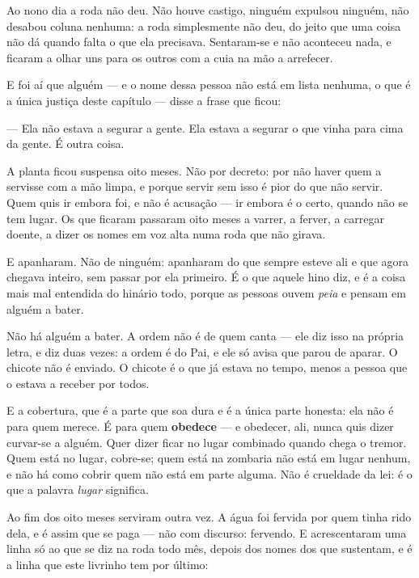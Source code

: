 \documentclass[livro.tex]{subfiles}
\begin{document}
\medskip

Ao nono dia a roda não deu. Não houve castigo, ninguém expulsou ninguém, não desabou coluna
nenhuma: a roda simplesmente não deu, do jeito que uma coisa não dá quando falta o que ela
precisava. Sentaram-se e não aconteceu nada, e ficaram a olhar uns para os outros com a cuia na
mão a arrefecer.

E foi aí que alguém --- e o nome dessa pessoa não está em lista nenhuma, o que é a única
justiça deste capítulo --- disse a frase que ficou:

--- Ela não estava a segurar a gente. Ela estava a segurar o que vinha para cima da gente. É
outra coisa.

\medskip

A planta ficou suspensa oito meses. Não por decreto: por não haver quem a servisse com a mão
limpa, e porque servir sem isso é pior do que não servir. Quem quis ir embora foi, e não é
acusação --- ir embora é o certo, quando não se tem lugar. Os que ficaram passaram oito meses a
varrer, a ferver, a carregar doente, a dizer os nomes em voz alta numa roda que não girava.

E apanharam. Não de ninguém: apanharam do que sempre esteve ali e que agora chegava inteiro,
sem passar por ela primeiro. É o que aquele hino diz, e é a coisa mais mal entendida do hinário
todo, porque as pessoas ouvem \emph{peia} e pensam em alguém a bater.

Não há alguém a bater. A ordem não é de quem canta --- ele diz isso na própria letra, e diz duas
vezes: a ordem é do Pai, e ele só avisa que parou de aparar. O chicote não é enviado. O chicote é
o que já estava no tempo, menos a pessoa que o estava a receber por todos.

\medskip

E a cobertura, que é a parte que soa dura e é a única parte honesta: ela não é para quem merece.
É para quem \textbf{obedece} --- e obedecer, ali, nunca quis dizer curvar-se a alguém. Quer dizer
ficar no lugar combinado quando chega o tremor. Quem está no lugar, cobre-se; quem está na
zombaria não está em lugar nenhum, e não há como cobrir quem não está em parte alguma. Não é
crueldade da lei: é o que a palavra \emph{lugar} significa.

\medskip

Ao fim dos oito meses serviram outra vez. A água foi fervida por quem tinha rido dela, e é assim
que se paga --- não com discurso: fervendo. E acrescentaram uma linha só ao que se diz na roda
todo mês, depois dos nomes dos que sustentam, e é a linha que este livrinho tem por último:
\end{document}
